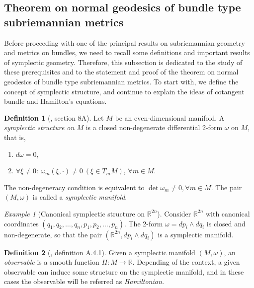 \documentclass[12pt, letterpaper, reqno]{amsart}
\theoremstyle{definition}
\newtheorem{df}{Definition}
\theoremstyle{plain}
\theoremstyle{remark}
\newtheorem{ex}{Example}
\begin{document}
\subsection{Theorem on normal geodesics of bundle type subriemannian metrics}
Before proceeding with one of the principal results on subriemannian geometry and metrics on bundles, we need to recall some definitions and important results of symplectic geometry. Therefore, this subsection is dedicated to the study of these prerequisites and to the statement and proof of the theorem on normal geodesics of bundle type subriemannian metrics. To start with, we define the concept of symplectic structure, and continue to explain the ideas of cotangent bundle and Hamilton's equations.
\begin{df}[\cite{arnol2013mathematical}, section 8A]
	Let $ M $ be an even-dimensional manifold. A \textit{symplectic structure on $ M $ } is a closed non-degenerate differential 2-form $ \omega $ on $ M $, that is, 
	\begin{enumerate}
		\item $ d\omega=0 $,
		\item $\forall \xi \neq 0: \ \omega_m(\xi,\cdot)\neq0 \ (\xi\in T_m M)$, $ \forall m \in M. $  
	  
	\end{enumerate}
	The non-degeneracy condition is equivalent to $ \operatorname{det} \omega_m\neq 0, \forall m\in M $. The pair $ (M,\omega) $ is called a \textit{symplectic manifold}. 
\end{df}

\begin{ex}[Canonical symplectic structure on $ \mathbb{R}^{2n}$]
	Consider $ \mathbb{R}^{2n} $ with canonical coordinates $ (q_1,q_2,\dots,q_n,p_1,p_2,\dots,p_n) $. The 2-form $ \omega = dp_i\wedge dq_i $ is closed and non-degenerate, so that the pair $ ( \mathbb{R}^{2n}, dp_i\wedge dq_i) $ is a symplectic manifold.  
\end{ex}

\begin{df}[\cite{montgomery2002tour}, definition A.4.1]
	Given a symplectic manifold  $ (M,\omega) $, an \textit{observable} is a smooth function $ H: M \rightarrow \mathbb{R}. $ Depending of the context, a given observable can induce some structure on the symplectic manifold, and in these cases the observable will be referred as \textit{Hamiltonian.} 
\end{df}
\end{document}
